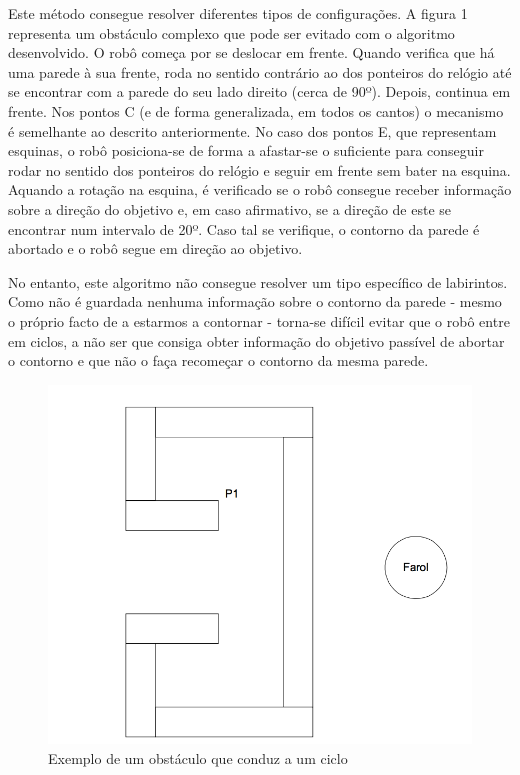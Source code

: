 \documentclass[citeauthoryear]{llncs} %
\begin{document}
Este método consegue resolver diferentes tipos de configurações. A figura 1 representa um obstáculo complexo que pode ser evitado com o algoritmo desenvolvido. O robô começa por se deslocar em frente. Quando verifica que há uma parede à sua frente, roda no sentido contrário ao dos ponteiros do relógio até se encontrar com a parede do seu lado direito (cerca de 90º). Depois, continua em frente. Nos pontos C (e de forma generalizada, em todos os cantos) o mecanismo é  semelhante ao descrito anteriormente. No caso dos pontos E, que representam esquinas, o robô posiciona-se de forma a afastar-se o suficiente para conseguir rodar no sentido dos ponteiros do relógio e seguir em frente sem bater na esquina. Aquando a rotação na esquina, é verificado se o robô consegue receber informação sobre a direção do objetivo e, em caso afirmativo, se a direção de este se encontrar num intervalo de 20º. Caso tal se verifique, o contorno da parede é abortado e o robô segue em direção ao objetivo.

No entanto, este algoritmo não consegue resolver um tipo específico de labirintos. Como não é guardada nenhuma informação sobre o contorno da parede - mesmo o próprio facto de a estarmos a contornar - torna-se difícil evitar que o robô entre em ciclos, a não ser que consiga obter informação do objetivo passível de abortar o contorno e que não o faça recomeçar o contorno da mesma parede.  

\begin{figure}[htb]
\begin{center}
\includegraphics[scale=0.20]{fig2.png}
\caption{Exemplo de um obstáculo que conduz a um ciclo}
\end{center}
\end{figure}
\end{document}
